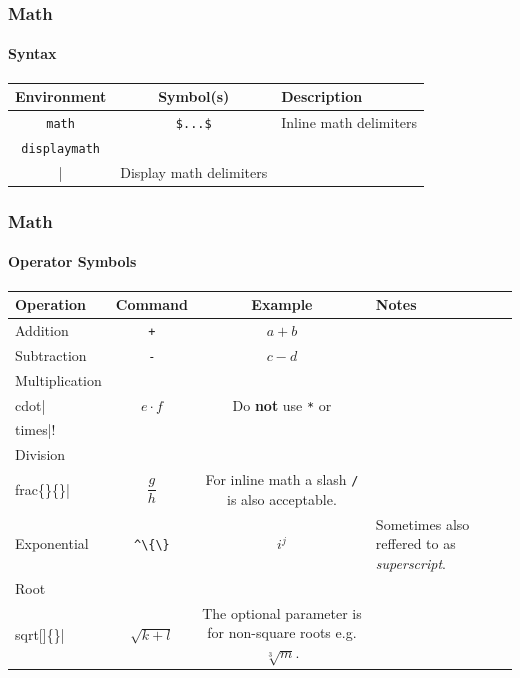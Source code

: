 \begin{frame}
    \frametitle{Math}
    \framesubtitle{Syntax}
    \begin{center}
    \begin{tabular}{ccl}
        \textbf{Environment}
            & \textbf{Symbol(s)}
            & \textbf{Description}\\
    \toprule[1.2pt]
        \lstinline|math|
            & \lstinline|$...$| 
            & Inline math delimiters\\
    \midrule\pause
        \lstinline|displaymath|
            & \lstinline|\\[...\\]|
            & Display math delimiters\\
    \end{tabular}
    \end{center}
\end{frame}

\begin{frame}
    \frametitle{Math}
    \framesubtitle{Operator Symbols}
    \begin{center}
    \begin{tabular}{l c c >{\raggedright\arraybackslash}m{5cm}}
        \textbf{Operation}
        & \textbf{Command}
        & \textbf{Example}
        & \textbf{Notes}\\
    \toprule[1.2pt]\pause
        Addition
        & \texttt{+}
        & $a + b$
        & \\
    \midrule\pause
        Subtraction
        & \texttt{-}
        & $c - d$
        & \\
    \midrule\pause
        Multiplication
        & \lstinline|\\cdot|
        & $e \cdot f$
        & Do \textbf{not} use \texttt{*} or \lstinline|\\times|!\\
    \midrule\pause
        Division
        & \lstinline|\\frac\{\}\{\}|
        & $\dfrac{g}{h}$ %
        & For inline math a slash \texttt{/} is also acceptable.\\
    \midrule\pause
        Exponential
        & \lstinline|^\{\}|
        & $i^{j}$
        & Sometimes also reffered to as \emph{superscript}.\\
    \midrule\pause
        Root
        & \lstinline|\\sqrt[]\{\}|
        & $\sqrt{k + l}$
        & The optional parameter is for non-square roots e.g. $\sqrt[3]{m}$.\\
    \end{tabular}
    \end{center}
\end{frame}

